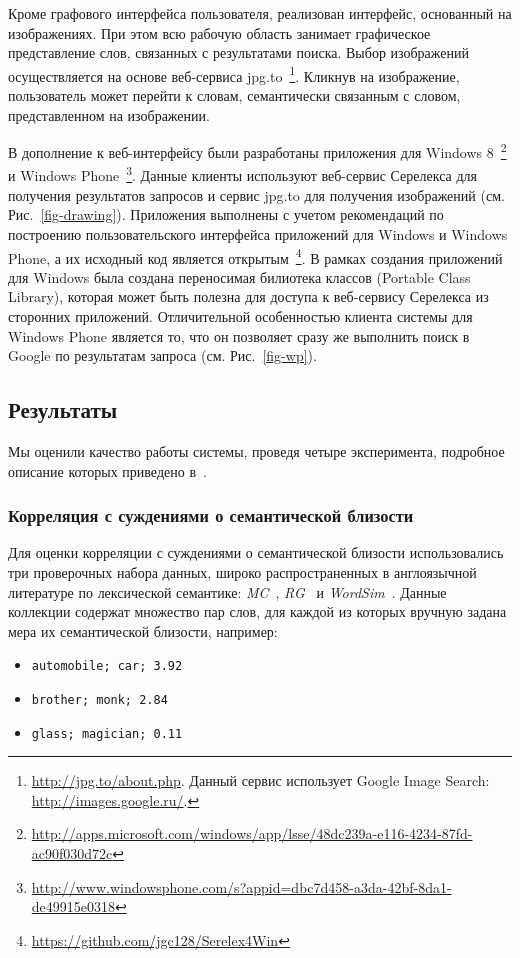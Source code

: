 \documentclass[a4paper,10pt,twoside]{article}
\begin{document}

Кроме графового интерфейса пользователя, реализован интерфейс, основанный на изображениях. При этом всю рабочую область занимает графическое представление слов, связанных с результатами поиска. Выбор изображений осуществляется на основе веб-сервиса jpg.to~\footnote{\url{http://jpg.to/about.php}. Данный сервис использует Google Image Search: \url{http://images.google.ru/}.}. Кликнув на изображение, пользователь может перейти к словам, семантически связанным с словом, представленном на изображении.


В дополнение к веб-интерфейсу были разработаны приложения для Windows 8~\footnote{\url{http://apps.microsoft.com/windows/app/lsse/48dc239a-e116-4234-87fd-ac90f030d72c}} и Windows Phone~\footnote{\url{http://www.windowsphone.com/s?appid=dbc7d458-a3da-42bf-8da1-de49915e0318}}. Данные клиенты используют веб-сервис Серелекса для получения результатов запросов и сервис jpg.to для получения изображений (см. Рис.~\ref{fig-drawing}). Приложения выполнены с учетом рекомендаций по построению пользовательского интерфейса приложений для Windows и Windows Phone, а их исходный код является открытым~\footnote{\url{https://github.com/jgc128/Serelex4Win}}. В рамках создания приложений для Windows была создана переносимая билиотека классов (Portable Class Library), которая может быть полезна для доступа к веб-сервису Серелекса из сторонних приложений. Отличительной особенностью клиента системы для Windows Phone является то, что он позволяет сразу же выполнить поиск в Google по результатам запроса (см. Рис.~\ref{fig-wp}).

\subsection{Результаты}
Мы оценили качество работы системы, проведя четыре эксперимента, подробное описание которых приведено в~\cite{panchenko2012konvens}.  

\subsubsection{Корреляция с суждениями о семантической близости} 
Для оценки корреляции с суждениями о семантической близости использовались три проверочных набора данных, широко распространенных в англоязычной литературе по лексической семантике: \textit{MC}~\cite{miller1993semantic}, \textit{RG}~\cite{rubenstein1965} и \textit{WordSim}~\cite{finkelstein2001placing}. Данные коллекции содержат множество пар слов, для каждой из которых вручную задана мера их семантической близости, например:
\begin{itemize}
  \footnotesize
  \item \texttt{automobile; car; 3.92}
  \item \texttt{brother; monk; 2.84}
  \item \texttt{glass; magician; 0.11}
\end{itemize}
\end{document}
